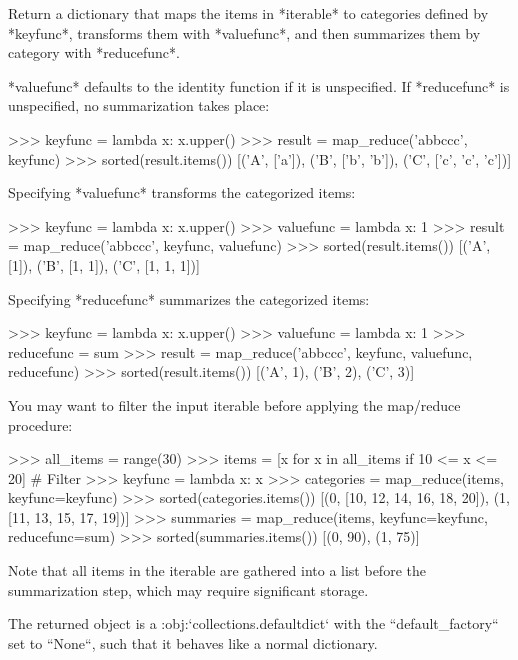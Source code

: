 \begin{DoxyVerb}Return a dictionary that maps the items in *iterable* to categories
defined by *keyfunc*, transforms them with *valuefunc*, and
then summarizes them by category with *reducefunc*.

*valuefunc* defaults to the identity function if it is unspecified.
If *reducefunc* is unspecified, no summarization takes place:

    >>> keyfunc = lambda x: x.upper()
    >>> result = map_reduce('abbccc', keyfunc)
    >>> sorted(result.items())
    [('A', ['a']), ('B', ['b', 'b']), ('C', ['c', 'c', 'c'])]

Specifying *valuefunc* transforms the categorized items:

    >>> keyfunc = lambda x: x.upper()
    >>> valuefunc = lambda x: 1
    >>> result = map_reduce('abbccc', keyfunc, valuefunc)
    >>> sorted(result.items())
    [('A', [1]), ('B', [1, 1]), ('C', [1, 1, 1])]

Specifying *reducefunc* summarizes the categorized items:

    >>> keyfunc = lambda x: x.upper()
    >>> valuefunc = lambda x: 1
    >>> reducefunc = sum
    >>> result = map_reduce('abbccc', keyfunc, valuefunc, reducefunc)
    >>> sorted(result.items())
    [('A', 1), ('B', 2), ('C', 3)]

You may want to filter the input iterable before applying the map/reduce
procedure:

    >>> all_items = range(30)
    >>> items = [x for x in all_items if 10 <= x <= 20]  # Filter
    >>> keyfunc = lambda x: x %
    >>> categories = map_reduce(items, keyfunc=keyfunc)
    >>> sorted(categories.items())
    [(0, [10, 12, 14, 16, 18, 20]), (1, [11, 13, 15, 17, 19])]
    >>> summaries = map_reduce(items, keyfunc=keyfunc, reducefunc=sum)
    >>> sorted(summaries.items())
    [(0, 90), (1, 75)]

Note that all items in the iterable are gathered into a list before the
summarization step, which may require significant storage.

The returned object is a :obj:`collections.defaultdict` with the
``default_factory`` set to ``None``, such that it behaves like a normal
dictionary.\end{DoxyVerb}
 \mbox{\label{namespacemore__itertools_1_1more_ae5b29c07e9e55ae5f3a86296e60c4abe}} 
